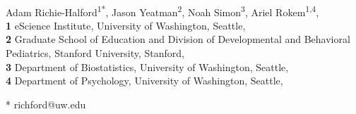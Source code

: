 \documentclass[10pt,letterpaper]{article}
\begin{document}
\vspace*{0.2in}

\begin{flushleft}
{\Large
\textbf{} %
}
\newline
\\
Adam Richie-Halford\textsuperscript{1*},
Jason Yeatman\textsuperscript{2},
Noah Simon\textsuperscript{3},
Ariel Rokem\textsuperscript{1,4},
\\
\bigskip
\textbf{1} eScience Institute, University of Washington, Seattle, 
\\
\textbf{2} Graduate School of Education and Division of Developmental and Behavioral Pediatrics, Stanford University, Stanford, 
\\
\textbf{3} Department of Biostatistics, University of Washington, Seattle, 
\\
\textbf{4} Department of Psychology, University of Washington, Seattle, 
\\
\bigskip

* richford@uw.edu

\end{flushleft}

\newcommand*{\alsLRatio}{$0.21$}
\newcommand*{\whLRatio}{$0.83$}
\newcommand*{\hbnLRatio}{$0.67$}
\newcommand*{\ccLRatio}{$0.68$}
\newcommand*{\alsLRatioGpca}{$0.4$}
\newcommand*{\whLRatioGpca}{$0.94$}
\newcommand*{\hbnLRatioGpca}{$0.82$}
\newcommand*{\ccLRatioGpca}{$0.8$}
\newcommand*{\alsAccuracy}{$83$}
\newcommand*{\alsRocAuc}{$0.88$}
\newcommand*{\alsAccuracyGpca}{$88$}
\newcommand*{\alsRocAucGpca}{$0.9$}
\newcommand*{\whRsq}{$0.52$}
\newcommand*{\whMae}{$2.67$}
\newcommand*{\hbnRsq}{$0.57$}
\newcommand*{\hbnMae}{$1.45$}
\newcommand*{\camcanRsq}{$0.77$}
\newcommand*{\camcanMae}{$6.02$}
\newcommand*{\whgpcaRsq}{$0.51$}
\newcommand*{\whgpcaMae}{$3.13$}
\newcommand*{\hbngpcaRsq}{$0.41$}
\newcommand*{\hbngpcaMae}{$1.61$}
\newcommand*{\camcangpcaRsq}{$0.68$}
\newcommand*{\camcangpcaMae}{$7.82$}
\end{document}
